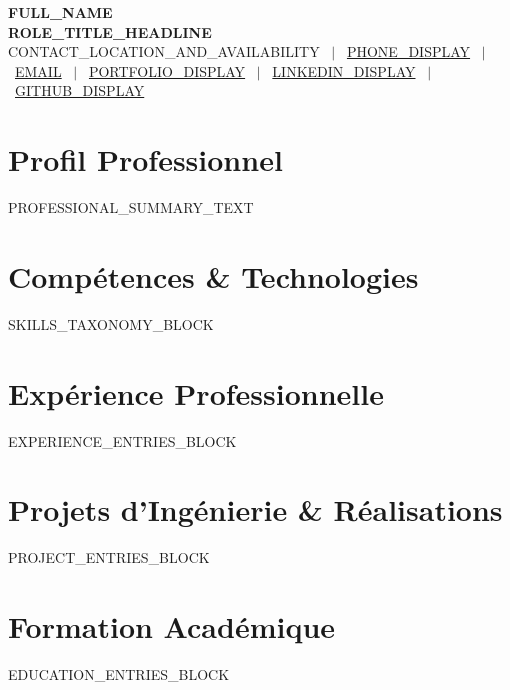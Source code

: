 \documentclass[letterpaper,10pt]{article}
\newcommand{\resumeSubHeadingListStart}{\begin{itemList}[leftmargin=0.1in, label={}]}
\newcommand{\resumeSubHeadingListEnd}{\end{itemList}}
\newenvironment{itemList}[1][]
  {\begin{itemize}[#1]}
  {\end{itemize}}
\begin{document}
\begin{center}
    {\LARGE \textbf{\scshape {{FULL_NAME}}}} \\ \vspace{2pt}
    {\small \textbf{\color{NavyBlue} {{ROLE_TITLE_HEADLINE}}}} \\ \vspace{2pt}
    \footnotesize 
    {{CONTACT_LOCATION_AND_AVAILABILITY}} \ $|$ \ 
    \href{tel:{{PHONE_RAW}}}{{{PHONE_DISPLAY}}} \ $|$ \ 
    \href{mailto:{{EMAIL}}}{{{EMAIL}}} \ $|$ \ 
    \href{{{PORTFOLIO_URL}}}{{{PORTFOLIO_DISPLAY}}} \ $|$ \ 
    \href{{{LINKEDIN_URL}}}{{{LINKEDIN_DISPLAY}}} \ $|$ \ 
    \href{{{GITHUB_URL}}}{{{GITHUB_DISPLAY}}}
\end{center}

\vspace{-6pt}

\section{Profil Professionnel}
\small{
{{PROFESSIONAL_SUMMARY_TEXT}}
}

\vspace{0pt}

\section{Compétences \& Technologies}
 \begin{itemList}[leftmargin=0.1in, label={}]
    \small{\item{
      {{SKILLS_TAXONOMY_BLOCK}}
    }}
 \end{itemList}

\vspace{-4pt}

\section{Expérience Professionnelle}
  \resumeSubHeadingListStart

{{EXPERIENCE_ENTRIES_BLOCK}}

  \resumeSubHeadingListEnd

\vspace{-4pt}

\section{Projets d'Ingénierie \& Réalisations}
  \resumeSubHeadingListStart

{{PROJECT_ENTRIES_BLOCK}}

  \resumeSubHeadingListEnd

\vspace{-4pt}

\section{Formation Académique}
  \resumeSubHeadingListStart

{{EDUCATION_ENTRIES_BLOCK}}

  \resumeSubHeadingListEnd
\end{document}
